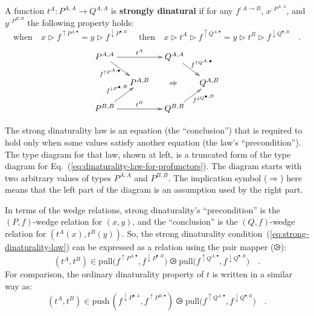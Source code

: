 A function $t^{A}:P^{A,A}\rightarrow Q^{A,A}$ is \textbf{strongly
dinatural} if for any $f^{:A\rightarrow B}$,
$x^{:P^{A,A}}$, and $y^{:P^{B,B}}$ the following property holds:
\begin{equation}
\text{when}\quad x\triangleright f^{\uparrow P^{A,\bullet}}=y\triangleright f^{\downarrow P^{\bullet,B}}\quad\text{ then}\quad x\triangleright t^{A}\triangleright f^{\uparrow Q^{A,\bullet}}=y\triangleright t^{B}\triangleright f^{\downarrow Q^{\bullet,B}}\quad.\label{eq:strong-dinaturality-law}
\end{equation}
\[
\xymatrix{\xyScaleY{1.2pc}\xyScaleX{1.0pc}P^{A,A}\ar[rd]\sb(0.35){f^{\uparrow P^{A,\bullet}}\negthickspace\negthickspace}\ar[rr]\sp(0.5){t^{A}} &  & Q^{A,A}\ar[rd]\sp(0.5){f^{\uparrow Q^{A,\bullet}}}\\
 & P^{A,B} & \negthickspace\Rightarrow & Q^{A,B}\\
P^{B,B}\ar[ru]\sp(0.5){f^{\downarrow P^{\bullet,B}}\negthickspace\negthickspace\negthickspace}\ar[rr]\sp(0.5){t^{B}} &  & Q^{B,B}\ar[ru]\sb(0.65){\negthickspace\negthickspace f^{\downarrow Q^{\bullet,B}}}
}
\]

The strong dinaturality law is an equation (the \textsf{``}conclusion\textsf{''})
that is required to hold only when some values satisfy another equation
(the law\textsf{'}s \textsf{``}precondition\textsf{''}). The type diagram for that law, shown
at left, is a truncated form of the type diagram for Eq.~(\ref{eq:dinaturality-law-for-profunctors}).
The diagram starts with two arbitrary values of types $P^{A,A}$ and
$P^{B,B}$. The implication symbol ($\Rightarrow$) here means that
the left part of the diagram is an assumption used by the right part.

In terms of the wedge relations, strong dinaturality\textsf{'}s \textsf{``}precondition\textsf{''}
is the $\left(P,f\right)$-wedge relation for $(x,y)$, and the \textsf{``}conclusion\textsf{''}
is the $\left(Q,f\right)$-wedge relation for $(t^{A}(x),t^{B}(y))$.
So, the strong dinaturality condition~(\ref{eq:strong-dinaturality-law})
can be expressed as a relation using the pair mapper ($\ogreaterthan$):
\[
(t^{A},t^{B})\in\text{pull}\big(f^{\uparrow P^{A,\bullet}},f^{\downarrow P^{\bullet,B}}\big)\ogreaterthan\text{pull}\big(f^{\uparrow Q^{A,\bullet}},f^{\downarrow Q^{\bullet,B}}\big)\quad.
\]
For comparison, the ordinary dinaturality property of $t$ is written
in a similar way as:
\[
(t^{A},t^{B})\in\text{push}\,(f^{\downarrow P^{\bullet,A}},f^{\uparrow P^{B,\bullet}})\ogreaterthan\text{pull}\big(f^{\uparrow Q^{A,\bullet}},f^{\downarrow Q^{\bullet,B}}\big)\quad.
\]


